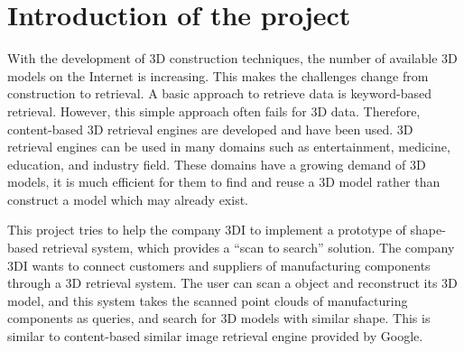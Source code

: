 

 





\section{Introduction of the project}

With the development of 3D construction techniques, the number of available 3D models on the Internet is increasing. This makes the challenges change from construction to retrieval. A basic approach to retrieve data is keyword-based retrieval. However, this simple approach often fails for 3D data. Therefore, content-based 3D retrieval engines are developed and have been used. 3D retrieval engines can be used in many domains such as entertainment, medicine, education, and industry field. These domains have a growing demand of 3D models, it is much efficient for them to find and reuse a 3D model rather than construct a model which may already exist. 

This project tries to help the company 3DI to implement a prototype of shape-based retrieval system, which provides a ``scan to search'' solution. The company 3DI wants to connect customers and suppliers of manufacturing components through a 3D retrieval system. The user can scan a object and reconstruct its 3D model, and this system takes the scanned point clouds of manufacturing components as queries, and search for 3D models with similar shape. This is similar to content-based similar image retrieval engine provided by Google. 

